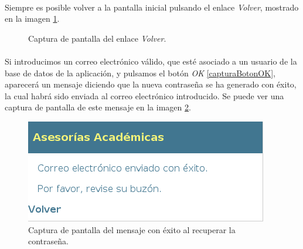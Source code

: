   \paragraph{}Siempre es posible volver a la pantalla inicial pulsando el enlace
  \textit{Volver}, mostrado en la imagen \ref{capturaEnlaceVolver}.

  \begin{figure}[!ht]
    \begin{center}
      \caption{Captura de pantalla del enlace \textit{Volver}.}
      \label{capturaEnlaceVolver}
    \end{center}
  \end{figure}

  \paragraph{}Si introducimos un correo electrónico válido, que esté asociado a
  un usuario de la base de datos de la aplicación, y pulsamos el botón
  \textit{OK} \ref{capturaBotonOK}, aparecerá un mensaje diciendo que la nueva
  contraseña se ha generado con éxito, la cual habrá sido enviada al correo
  electrónico introducido. Se puede ver una captura de pantalla de este mensaje
  en la imagen \ref{capturaPedirCorreoExito}.

  \begin{figure}[!ht]
    \begin{center}
      \includegraphics[]{4.Funcionamiento_Aplicacion/4.2.Acceso_Sistema/4.2.1.Recordar_Password/Capturas/pedir_correo_exito.png}
      \caption{Captura de pantalla del mensaje con éxito al recuperar la contraseña.}
      \label{capturaPedirCorreoExito}
    \end{center}
  \end{figure}

